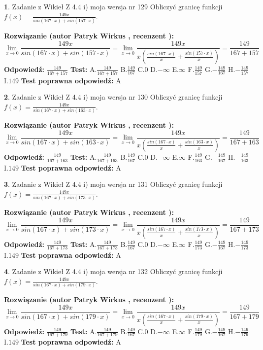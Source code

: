 \documentclass[12pt, a4paper]{article}
\theoremstyle{definition} %
\newtheorem{zad}{}
\newcommand{\zadStart}[1]{\begin{zad}#1\newline}
\newcommand{\zadStop}{\end{zad}}
\newcommand{\rozwStart}[2]{\noindent \textbf{Rozwiązanie (autor #1 , recenzent #2): }\newline}
\newcommand{\rozwStop}{\newline}
\newcommand{\odpStart}{\noindent \textbf{Odpowiedź:}\newline}
\newcommand{\odpStop}{\newline}
\newcommand{\testStart}{\noindent \textbf{Test:}\newline}
\newcommand{\testStop}{\newline}
\newcommand{\kluczStart}{\noindent \textbf{Test poprawna odpowiedź:}\newline}
\newcommand{\kluczStop}{\newline}
\begin{document}
\zadStart{Zadanie z Wikieł Z 4.4 i) moja wersja nr 129}
Obliczyć granicę funkcji $f(x)=\frac{149x}{sin(167\cdot x) +sin(157\cdot x)}$.
\zadStop
\rozwStart{Patryk Wirkus}{}
$$\lim\limits_{x\to 0}\frac{149x}{sin(167\cdot x) +sin(157\cdot x)}=\lim\limits_{x\to 0}\frac{149x}{x(\frac{sin(167\cdot x)}{x}+\frac{sin(157\cdot x)}{x})}=\frac{149}{167+157}$$
\rozwStop
\odpStart
$\frac{149}{167+157}$
\odpStop
\testStart
A.$\frac{149}{167+157}$
B.$\frac{149}{167}$
C.$0$
D.$-\infty$
E.$\infty$
F.$\frac{149}{157}$
G.$-\frac{149}{167}$
H.$-\frac{149}{157}$
I.$149$
\testStop
\kluczStart
A
\kluczStop



\zadStart{Zadanie z Wikieł Z 4.4 i) moja wersja nr 130}
Obliczyć granicę funkcji $f(x)=\frac{149x}{sin(167\cdot x) +sin(163\cdot x)}$.
\zadStop
\rozwStart{Patryk Wirkus}{}
$$\lim\limits_{x\to 0}\frac{149x}{sin(167\cdot x) +sin(163\cdot x)}=\lim\limits_{x\to 0}\frac{149x}{x(\frac{sin(167\cdot x)}{x}+\frac{sin(163\cdot x)}{x})}=\frac{149}{167+163}$$
\rozwStop
\odpStart
$\frac{149}{167+163}$
\odpStop
\testStart
A.$\frac{149}{167+163}$
B.$\frac{149}{167}$
C.$0$
D.$-\infty$
E.$\infty$
F.$\frac{149}{163}$
G.$-\frac{149}{167}$
H.$-\frac{149}{163}$
I.$149$
\testStop
\kluczStart
A
\kluczStop



\zadStart{Zadanie z Wikieł Z 4.4 i) moja wersja nr 131}
Obliczyć granicę funkcji $f(x)=\frac{149x}{sin(167\cdot x) +sin(173\cdot x)}$.
\zadStop
\rozwStart{Patryk Wirkus}{}
$$\lim\limits_{x\to 0}\frac{149x}{sin(167\cdot x) +sin(173\cdot x)}=\lim\limits_{x\to 0}\frac{149x}{x(\frac{sin(167\cdot x)}{x}+\frac{sin(173\cdot x)}{x})}=\frac{149}{167+173}$$
\rozwStop
\odpStart
$\frac{149}{167+173}$
\odpStop
\testStart
A.$\frac{149}{167+173}$
B.$\frac{149}{167}$
C.$0$
D.$-\infty$
E.$\infty$
F.$\frac{149}{173}$
G.$-\frac{149}{167}$
H.$-\frac{149}{173}$
I.$149$
\testStop
\kluczStart
A
\kluczStop



\zadStart{Zadanie z Wikieł Z 4.4 i) moja wersja nr 132}
Obliczyć granicę funkcji $f(x)=\frac{149x}{sin(167\cdot x) +sin(179\cdot x)}$.
\zadStop
\rozwStart{Patryk Wirkus}{}
$$\lim\limits_{x\to 0}\frac{149x}{sin(167\cdot x) +sin(179\cdot x)}=\lim\limits_{x\to 0}\frac{149x}{x(\frac{sin(167\cdot x)}{x}+\frac{sin(179\cdot x)}{x})}=\frac{149}{167+179}$$
\rozwStop
\odpStart
$\frac{149}{167+179}$
\odpStop
\testStart
A.$\frac{149}{167+179}$
B.$\frac{149}{167}$
C.$0$
D.$-\infty$
E.$\infty$
F.$\frac{149}{179}$
G.$-\frac{149}{167}$
H.$-\frac{149}{179}$
I.$149$
\testStop
\kluczStart
A
\kluczStop
\end{document}

